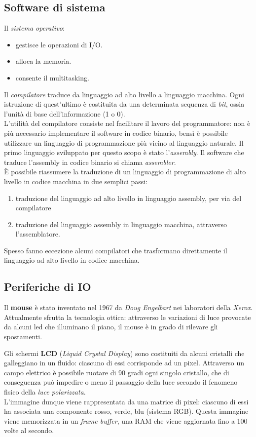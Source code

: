 \subsection{Software di sistema}
Il \textit{sistema operativo}:
\begin{itemize}[noitemsep]
	\item gestisce le operazioni di I/O.
	\item alloca la memoria.
	\item consente il multitasking.
\end{itemize}
Il \textit{compilatore} traduce da linguaggio ad alto livello a linguaggio macchina. Ogni istruzione di quest'ultimo è costituita da una determinata sequenza di \textit{bit}, ossia l'unità di base dell'informazione (1 o 0).\\
L'utilità del compilatore consiste nel facilitare il lavoro del programmatore: non è più necessario implementare il software in codice binario, bensì è possibile utilizzare un linguaggio di programmazione più vicino al linguaggio naturale. Il primo linguaggio sviluppato per questo scopo è stato l'\textit{assembly}. Il software che traduce l'assembly in codice binario si chiama \textit{assembler}.\\
\`{E} possibile riassumere la traduzione di un linguaggio di programmazione di alto livello in codice macchina in due semplici passi:
\begin{enumerate}[noitemsep]
	\item traduzione del linguaggio ad alto livello in linguaggio assembly, per via del compilatore
	\item traduzione del linguaggio assembly in linguaggio macchina, attraverso l'assemblatore.
\end{enumerate}
Spesso fanno eccezione alcuni compilatori che trasformano direttamente il linguaggio ad alto livello in codice macchina.

\subsection{Periferiche di IO}
Il \textbf{mouse} è stato inventato nel 1967 da \textit{Doug Engelbart} nei laboratori della \textit{Xerox}. Attualmente sfrutta la tecnologia ottica: attraverso le variazioni di luce provocate da alcuni led che illuminano il piano, il mouse è in grado di rilevare gli spostamenti.

Gli schermi \textbf{LCD} (\textit{Liquid Crystal Display}) sono costituiti da alcuni cristalli che galleggiano in un fluido: ciascuno di essi corrisponde ad un pixel. Attraverso un campo elettrico è possibile ruotare di 90 gradi ogni singolo cristallo, che di conseguenza può impedire o meno il passaggio della luce secondo il fenomeno fisico della \textit{luce polarizzata}.\\
L'immagine dunque viene rappresentata da una matrice di pixel: ciascuno di essi ha associata una componente rosso, verde, blu (sistema RGB). Questa immagine viene memorizzata in un \textit{frame buffer}, una RAM che viene aggiornata  fino a 100 volte al secondo.


